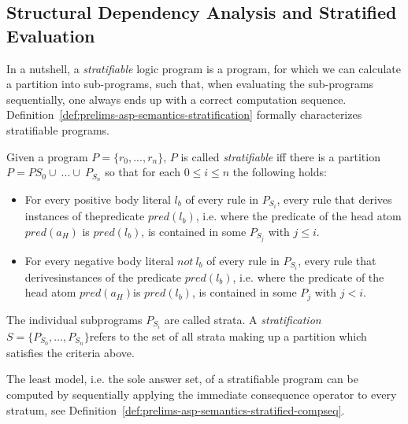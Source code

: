 \subsection{Structural Dependency Analysis and Stratified Evaluation}
\label{subsec:stratified-evaluation}

In a nutshell, a \emph{stratifiable} logic program is a program, for which we can calculate a partition into sub-programs, such that, when evaluating the sub-programs sequentially, one always ends up with a correct computation sequence. Definition~\ref{def:prelims-asp-semantics-stratification} formally characterizes stratifiable programs.

\begin{definition}
\label{def:prelims-asp-semantics-stratification}	
Given a program $P = \{r_{0}, ..., r_{n}\}$, $P$ is called \emph{stratifiable} iff there is a partition $P = P{S_0} \cup\ ... \cup\ P_{S_n}$ so that for each $0 \le i \leq n$ the following holds:
\begin{itemize}
	\item For every positive body literal $l_{b}$ of every rule in $P_{S_i}$, every rule that derives instances of thepredicate $\mathit{pred}(l_{b})$, i.e. where the predicate of the head atom $\mathit{pred}(a_H)$ is $\mathit{pred}(l_{b})$, is contained in some $P_{S_j}$ with $j \leq i$.
	\item For every negative body literal $\mathit{not}\ l_{b}$ of every rule in $P_{S_i}$, every rule that derivesinstances of the predicate $\mathit{pred}(l_{b})$, i.e. where the predicate of the head atom $\mathit{pred}(a_H)$is $\mathit{pred}(l_{b})$, is contained in some $P_{j}$ with $j < i$.
\end{itemize}
The individual subprograms $P_{S_i}$ are called strata. A \emph{stratification} $S = \{P_{S_0},\ldots, P_{S_n}\}$refers to the set of all strata making up a partition which satisfies the criteria above.
\end{definition}

The least model, i.e. the sole answer set, of a stratifiable program can be computed by sequentially applying the immediate consequence operator to every stratum, see Definition~\ref{def:prelims-asp-semantics-stratified-compseq}.

